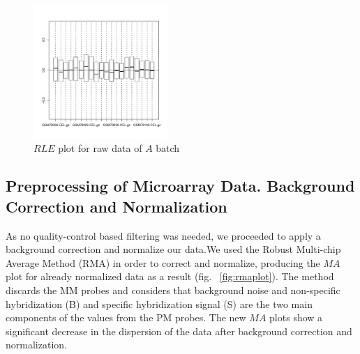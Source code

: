 \documentclass{article}
\begin{document}
\begin{figure}[h]
\centerline{\includegraphics[width=0.45\textwidth]{A_RLEplot.pdf}}
\caption{$RLE$ plot for raw data of $A$ batch}
\label{fig:rleplot}
\end{figure}

\subsection{Preprocessing of Microarray Data. Background Correction and Normalization}
As no quality-control based filtering was needed, we proceeded to apply a background correction and normalize our data.We used the Robust Multi-chip Average Method (RMA) in order to correct and normalize, producing the $MA$ plot for already normalized data as a result (fig. ~\ref{fig:rmaplot}). The method discards the MM probes and considers that background noise and non-specific hybridization (B) and specific hybridization signal (S) are the two main components of the values from the PM probes. The new $MA$ plots show a significant decrease in the dispersion of the data after background correction and normalization.
\end{document}
